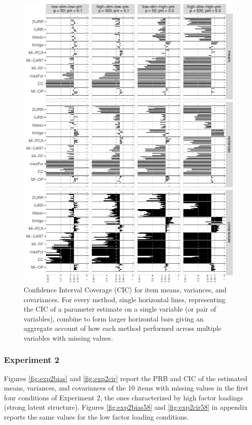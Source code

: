 \documentclass[11pt]{article}
\begin{document}
\begin{figure}
\centering
\includegraphics{../../output/graphs/exp1_CI.pdf}
\caption{\label{fig:exp1cir}
	Confidence Interval Coverage (CIC) for item means, variances, and covariances. 
	For every method, single horizontal lines, representing the CIC of a parameter estimate on 
	a single variable (or pair of variables), combine to form larger horizontal bars giving an 
	aggregate account of how each method performed across multiple variables with missing values.
	}
\end{figure}

\FloatBarrier


\subsubsection{Experiment 2}

	Figures \ref{fig:exp2bias} and \ref{fig:exp2cir} report the PRB and CIC of the estimated means, variances, 
	and covariances of the 10 items with missing values in the first four conditions of Experiment 2, 
	the ones characterized by high factor loadings (strong latent structure).
	Figures \ref{fig:exp2bias58} and \ref{fig:exp2cir58} in appendix reports the same values for the low 
	factor loading conditions.
\end{document}
